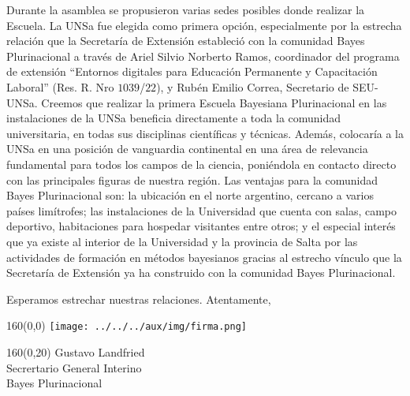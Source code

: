 \documentclass[a4paper,10pt]{letter}
\begin{document}
\begin{letter}
\hspace{1cm}
Durante la asamblea se propusieron varias sedes posibles donde realizar la Escuela.
%
La UNSa fue elegida como primera opción, especialmente por la estrecha relación que la Secretaría de Extensión estableció con la comunidad Bayes Plurinacional a través de Ariel Silvio Norberto Ramos, coordinador del programa de extensión ``Entornos digitales para Educación Permanente y Capacitación Laboral'' (Res. R. Nro $1039$/$22$), y Rubén Emilio Correa, Secretario de SEU-UNSa.
%
Creemos que realizar la primera Escuela Bayesiana Plurinacional en las instalaciones de la UNSa beneficia directamente a toda la comunidad universitaria, en todas sus disciplinas científicas y técnicas.
%
Además, colocaría a la UNSa en una posición de vanguardia continental en una área de relevancia fundamental para todos los campos de la ciencia, poniéndola en contacto directo con las principales figuras de nuestra región.
%
Las ventajas para la comunidad Bayes Plurinacional son: la ubicación en el norte argentino, cercano a varios países limítrofes; las instalaciones de la Universidad que cuenta con salas, campo deportivo, habitaciones para hospedar visitantes entre otros; y el especial interés que ya existe al interior de la Universidad y la provincia de Salta por las actividades de formación en métodos bayesianos gracias al estrecho vínculo que la Secretaría de Extensión ya ha construido con la comunidad Bayes Plurinacional.


\hspace{1cm}
Esperamos estrechar nuestras relaciones. Atentamente,

\vspace{.3cm}

\begin{textblock}{160}(0,0)
\phantom{.} \hfill \texttt{[image: ../../../aux/img/firma.png]}\hspace{2cm}\phantom{.} \\[0cm]
\end{textblock}
\begin{textblock}{160}(0,20)
 \phantom{.} \hfill Gustavo Landfried \hspace{2.5cm}\phantom{.}\\ \small
\phantom{.} \hfill Secrertario General Interino \hspace{2.5cm}\phantom{.}\\
\phantom{.} \hfill Bayes Plurinacional \hspace{2.5cm}\phantom{.}\\
\end{textblock}


\end{letter}
\end{document}
